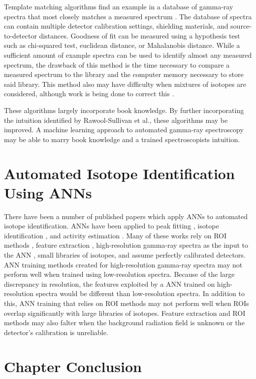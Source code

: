 Template matching algorithms find an example in a database of gamma-ray spectra that most closely matches a measured spectrum \cite{burr2009}. The database of spectra can contain multiple detector calibration settings, shielding materials, and source-to-detector distances. Goodness of fit can be measured using a hypothesis test such as chi-squared test, euclidean distance, or Mahalanobis distance. While a sufficient amount of example spectra can be used to identify almost any measured spectrum, the drawback of this method is the time necessary to compare a measured spectrum to the library and the computer memory necessary to store said library. This method also may have difficulty when mixtures of isotopes are considered, although work is being done to correct this \cite{mattingly2010}.

These algorithms largely incorporate book knowledge. By further incorporating the intuition identified by Rawool-Sullivan et al., these algorithms may be improved. A machine learning approach to automated gamma-ray spectroscopy may be able to marry book knowledge and a trained spectroscopists intuition.


\section{Automated Isotope Identification Using ANNs}

There have been a number of published papers which apply ANNs to automated isotope identification. ANNs have been applied to peak fitting \cite{Abdel-Aal2002}, isotope identification \cite{Abdel-Aal1996, Medhat2012}, and activity estimation \cite{Abdel-Aal1996, Vigneron1996}. Many of these works rely on ROI methods \cite{Pilato1999}, feature extraction \cite{Chen2009}, high-resolution gamma-ray spectra as the input to the ANN \cite{Yoshida2002}, small libraries of isotopes, and assume perfectly calibrated detectors. ANN training methods created for high-resolution gamma-ray spectra may not perform well when trained using low-resolution spectra. Because of the large discrepancy in resolution, the features exploited by a ANN trained on high-resolution spectra would be different than low-resolution spectra. In addition to this, ANN training that relies on ROI methods may not perform well when ROIs overlap significantly with large libraries of isotopes. Feature extraction and ROI methods may also falter when the background radiation field is unknown or the detector's calibration is unreliable.  


\section{Chapter Conclusion}

